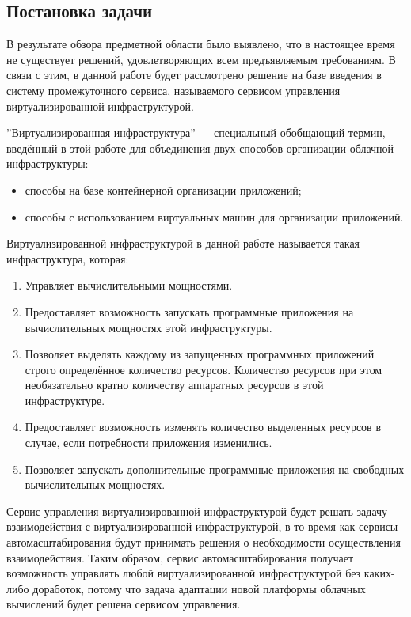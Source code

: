 \subsection{Постановка задачи}
В результате обзора предметной области было выявлено, что в настоящее время не существует решений, удовлетворяющих всем предъявляемым требованиям.
В связи с этим, в данной работе будет рассмотрено решение на базе введения в систему промежуточного сервиса, называемого сервисом управления виртуализированной инфраструктурой.

''Виртуализированная инфраструктура'' --- специальный обобщающий термин, введённый в этой работе для объединения двух способов организации облачной инфраструктуры:
\begin{itemize}
    \item способы на базе контейнерной организации приложений;
    \item способы с использованием виртуальных машин для организации приложений.
\end{itemize}
Виртуализированной инфраструктурой в данной работе называется такая инфраструктура, которая:
\begin{enumerate}
    \item Управляет вычислительными мощностями.
    \item Предоставляет возможность запускать программные приложения на вычислительных мощностях этой инфраструктуры.
    \item Позволяет выделять каждому из запущенных программных приложений строго определённое количество ресурсов. 
    Количество ресурсов при этом необязательно кратно количеству аппаратных ресурсов в этой инфраструктуре.
    \item Предоставляет возможность изменять количество выделенных ресурсов в случае, если потребности приложения изменились.
    \item Позволяет запускать дополнительные программные приложения на свободных вычислительных мощностях.
\end{enumerate}

Сервис управления виртуализированной инфраструктурой будет решать задачу взаимодействия с виртуализированной инфраструктурой, в то время как сервисы автомасштабирования будут принимать решения о необходимости осуществления взаимодействия.
Таким образом, сервис автомасштабирования получает возможность управлять любой виртуализированной инфраструктурой без каких-либо доработок, потому что задача адаптации новой платформы облачных вычислений будет решена сервисом управления.

